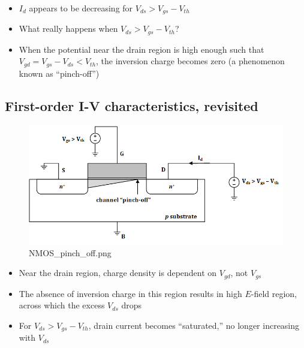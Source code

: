 \documentclass[11pt]{article}
\providecommand{\tightlist}{%
      \setlength{\itemsep}{0pt}\setlength{\parskip}{0pt}}
\begin{document}
    \begin{center}
    \end{center}
    { \hspace*{\fill} \\}
    
    \begin{itemize}
\tightlist
\item
  \(I_d\) appears to be decreasing for \(V_{ds} > V_{gs} - V_{th}\)
\item
  What really happens when \(V_{ds} > V_{gs} - V_{th}\)?
\item
  When the potential near the drain region is high enough such that
  \(V_{gd} = V_{gs} - V_{ds} < V_{th}\), the inversion charge becomes
  zero (a phenomenon known as ``pinch-off'')
\end{itemize}

    \hypertarget{first-order-i-v-characteristics-revisited}{%
\subsection{First-order I-V characteristics,
revisited}\label{first-order-i-v-characteristics-revisited}}

    \begin{figure}
\centering
\includegraphics{NMOS_pinch_off.png}
\caption{NMOS\_pinch\_off.png}
\end{figure}

    \begin{itemize}
\tightlist
\item
  Near the drain region, charge density is dependent on \(V_{gd}\), not
  \(V_{gs}\)
\item
  The absence of inversion charge in this region results in high
  \(E\)-field region, across which the excess \(V_{ds}\) drops
\item
  For \(V_{ds} > V_{gs} - V_{th}\), drain current becomes ``saturated,''
  no longer increasing with \(V_{ds}\)
\end{itemize}
\end{document}
